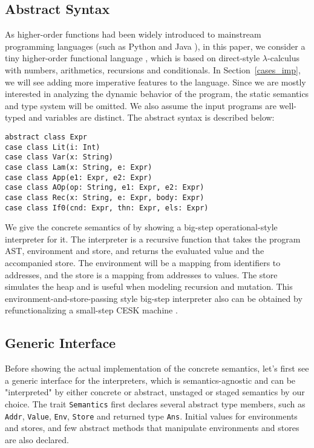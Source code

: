 \subsection{Abstract Syntax} \label{bg_lang}

As higher-order functions had been widely introduced to mainstream programming languages (such as Python and Java ), 
in this paper, we consider a tiny higher-order functional language \TLang, which is based on direct-style $\lambda$-calculus
with numbers, arithmetics, recursions and conditionals.
In Section~\ref{cases_imp}, we will see adding more imperative features to the language.
Since we are mostly interested in analyzing the dynamic behavior of the program, the static semantics and
type system will be omitted. We also assume the input programs are well-typed and variables are distinct.
The abstract syntax is described below:

\begin{lstlisting}
abstract class Expr
case class Lit(i: Int)
case class Var(x: String)
case class Lam(x: String, e: Expr)
case class App(e1: Expr, e2: Expr)
case class AOp(op: String, e1: Expr, e2: Expr)
case class Rec(x: String, e: Expr, body: Expr)
case class If0(cnd: Expr, thn: Expr, els: Expr)
\end{lstlisting}

We give the concrete semantics of \TLang by showing a big-step operational-style interpreter for it.
The interpreter is a recursive function that takes the program AST, environment and store, and returns 
the evaluated value and the accompanied store. The environment will be a mapping from identifiers to addresses,
and the store is a mapping from addresses to values. The store simulates the heap and is useful when modeling 
recursion and mutation.
This environment-and-store-passing style big-step interpreter also can be obtained by 
refunctionalizing \cite{DBLP:conf/ppdp/AgerBDM03, Wei:2018:RAA:3243631.3236800} a small-step CESK 
machine \cite{DBLP:conf/popl/FelleisenF87}.

\subsection{Generic Interface} 
Before showing the actual implementation of the concrete semantics, let's first see 
a generic interface for the interpreters, which is semantics-agnostic and can be 
"interpreted" by either concrete or abstract, unstaged or staged semantics by our choice.
The trait \texttt{Semantics} first declares several abstract type members, such as \texttt{Addr},
\texttt{Value}, \texttt{Env}, \texttt{Store} and returned type \texttt{Ans}. 
Initial values for environments and stores, and few abstract methods that manipulate environments and stores are also declared.

